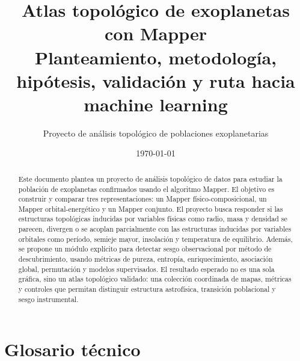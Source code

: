 \documentclass[11pt,letterpaper]{article}
\title{\vspace{-1.0cm}\textbf{Atlas topológico de exoplanetas con Mapper}\\
\large Planteamiento, metodología, hipótesis, validación y ruta hacia machine learning}
\author{Proyecto de análisis topológico de poblaciones exoplanetarias}
\date{\today}
\begin{document}
\maketitle

\begin{abstract}
Este documento plantea un proyecto de análisis topológico de datos para estudiar la población de exoplanetas confirmados usando el algoritmo Mapper. El objetivo es construir y comparar tres representaciones: un Mapper físico-composicional, un Mapper orbital-energético y un Mapper conjunto. El proyecto busca responder si las estructuras topológicas inducidas por variables físicas como radio, masa y densidad se parecen, divergen o se acoplan parcialmente con las estructuras inducidas por variables orbitales como período, semieje mayor, insolación y temperatura de equilibrio. Además, se propone un módulo explícito para detectar sesgo observacional por método de descubrimiento, usando métricas de pureza, entropía, enriquecimiento, asociación global, permutación y modelos supervisados. El resultado esperado no es una sola gráfica, sino un atlas topológico validado: una colección coordinada de mapas, métricas y controles que permitan distinguir estructura astrofísica, transición poblacional y sesgo instrumental.
\end{abstract}

\tableofcontents
\newpage

\section{Glosario técnico}
\end{document}
